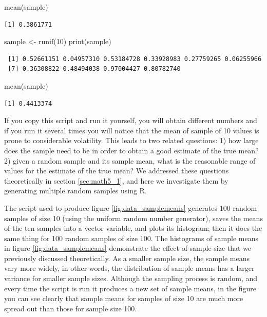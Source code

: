 \documentclass[
  letterpaper,
  DIV=11,
  numbers=noendperiod]{scrreprt}
\newenvironment{Shaded}{\begin{snugshade}}{\end{snugshade}}
\newcommand{\DecValTok}[1]{\textcolor[rgb]{0.68,0.00,0.00}{#1}}
\newcommand{\FunctionTok}[1]{\textcolor[rgb]{0.28,0.35,0.67}{#1}}
\newcommand{\NormalTok}[1]{\textcolor[rgb]{0.00,0.23,0.31}{#1}}
\newcommand{\OtherTok}[1]{\textcolor[rgb]{0.00,0.23,0.31}{#1}}
\begin{document}
\begin{Shaded}
\begin{Highlighting}[]
\FunctionTok{mean}\NormalTok{(sample)}
\end{Highlighting}
\end{Shaded}

\begin{verbatim}
[1] 0.3861771
\end{verbatim}

\begin{Shaded}
\begin{Highlighting}[]
\NormalTok{sample }\OtherTok{\textless{}{-}} \FunctionTok{runif}\NormalTok{(}\DecValTok{10}\NormalTok{)}
\FunctionTok{print}\NormalTok{(sample)}
\end{Highlighting}
\end{Shaded}

\begin{verbatim}
 [1] 0.52661151 0.04957310 0.53184728 0.33928983 0.27759265 0.06255966
 [7] 0.36308822 0.48494038 0.97004427 0.80782740
\end{verbatim}

\begin{Shaded}
\begin{Highlighting}[]
\FunctionTok{mean}\NormalTok{(sample)}
\end{Highlighting}
\end{Shaded}

\begin{verbatim}
[1] 0.4413374
\end{verbatim}

If you copy this script and run it yourself, you will obtain different
numbers and if you run it several times you will notice that the mean of
sample of 10 values is prone to considerable volatility. This leads to
two related questions: 1) how large does the sample need to be in order
to obtain a good estimate of the true mean? 2) given a random sample and
its sample mean, what is the reasonable range of values for the estimate
of the true mean? We addressed these questions theoretically in section
\ref{sec:math5_1}, and here we investigate them by generating multiple
random samples using R.

The script used to produce figure \ref{fig:data_samplemeans} generates
100 random samples of size 10 (using the uniform random number
generator), saves the means of the ten samples into a vector variable,
and plots its histogram; then it does the same thing for 100 random
samples of size 100. The histograms of sample means in figure
\ref{fig:data_samplemeans} demonstrate the effect of sample size that we
previously discussed theoretically. As a smaller sample size, the sample
means vary more widely, in other words, the distribution of sample means
has a larger variance for smaller sample sizes. Although the sampling
process is random, and every time the script is run it produces a new
set of sample means, in the figure you can see clearly that sample means
for samples of size 10 are much more spread out than those for sample
size 100.
\end{document}
